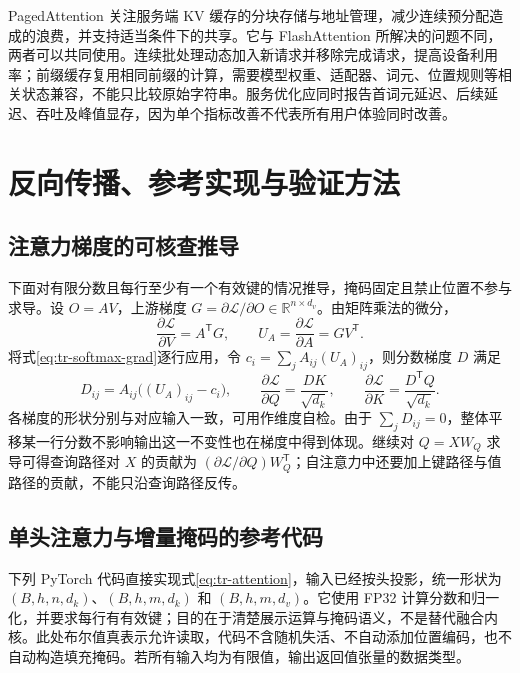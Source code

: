 \documentclass[UTF8,12pt,a4paper,fontset=fandol]{ctexart}
\begin{document}
PagedAttention 关注服务端 KV 缓存的分块存储与地址管理\cite{kwon2023}，减少连续预分配造成的浪费，并支持适当条件下的共享。它与 FlashAttention 所解决的问题不同，两者可以共同使用。连续批处理动态加入新请求并移除完成请求，提高设备利用率；前缀缓存复用相同前缀的计算，需要模型权重、适配器、词元、位置规则等相关状态兼容，不能只比较原始字符串。服务优化应同时报告首词元延迟、后续延迟、吞吐及峰值显存，因为单个指标改善不代表所有用户体验同时改善。

\section{反向传播、参考实现与验证方法}
\label{sec:tr-implementation}

\subsection{注意力梯度的可核查推导}

下面对有限分数且每行至少有一个有效键的情况推导，掩码固定且禁止位置不参与求导。设 $O=AV$，上游梯度 $G=\partial\mathcal L/\partial O\in\mathbb R^{n\times d_v}$。由矩阵乘法的微分，
\[
\frac{\partial\mathcal L}{\partial V}=A^{\mathsf T}G,
\qquad U_A=\frac{\partial\mathcal L}{\partial A}=GV^{\mathsf T}.
\]
将式\eqref{eq:tr-softmax-grad}逐行应用，令 $c_i=\sum_j A_{ij}(U_A)_{ij}$，则分数梯度 $D$ 满足
\begin{equation}
D_{ij}=A_{ij}\bigl((U_A)_{ij}-c_i\bigr),\qquad
\frac{\partial\mathcal L}{\partial Q}=\frac{DK}{\sqrt{d_k}},\qquad
\frac{\partial\mathcal L}{\partial K}=\frac{D^{\mathsf T}Q}{\sqrt{d_k}}.
\label{eq:tr-attention-backward}
\end{equation}
各梯度的形状分别与对应输入一致，可用作维度自检。由于 $\sum_jD_{ij}=0$，整体平移某一行分数不影响输出这一不变性也在梯度中得到体现。继续对 $Q=XW_Q$ 求导可得查询路径对 $X$ 的贡献为 $(\partial\mathcal L/\partial Q)W_Q^{\mathsf T}$；自注意力中还要加上键路径与值路径的贡献，不能只沿查询路径反传。

\subsection{单头注意力与增量掩码的参考代码}

下列 PyTorch 代码直接实现式\eqref{eq:tr-attention}，输入已经按头投影，统一形状为 $(B,h,n,d_k)$、$(B,h,m,d_k)$ 和 $(B,h,m,d_v)$。它使用 FP32 计算分数和归一化，并要求每行有有效键；目的在于清楚展示运算与掩码语义，不是替代融合内核。此处布尔值真表示允许读取，代码不含随机失活、不自动添加位置编码，也不自动构造填充掩码。若所有输入均为有限值，输出返回值张量的数据类型。
\end{document}
